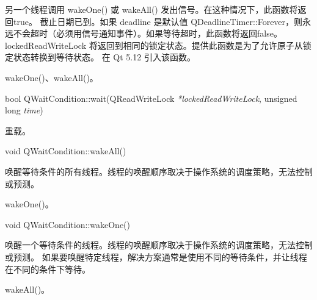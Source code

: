 另一个线程调用 wakeOne() 或 wakeAll() 发出信号。在这种情况下，此函数将返回true。
截止日期已到。如果 deadline 是默认值 QDeadlineTimer::Forever，则永远不会超时（必须用信号通知事件）。如果等待超时，此函数将返回false。
lockedReadWriteLock 将返回到相同的锁定状态。提供此函数是为了允许原子从锁定状态转换到等待状态。
在 Qt 5.12 引入该函数。


\begin{seeAlso}
wakeOne()、wakeAll()。
\end{seeAlso}


bool QWaitCondition::wait(QReadWriteLock \emph{*lockedReadWriteLock}, unsigned long \emph{time})

重载。

void QWaitCondition::wakeAll()

唤醒等待条件的所有线程。线程的唤醒顺序取决于操作系统的调度策略，无法控制或预测。

\begin{seeAlso}
wakeOne()。
\end{seeAlso}

void QWaitCondition::wakeOne()

唤醒一个等待条件的线程。线程的唤醒顺序取决于操作系统的调度策略，无法控制或预测。
如果要唤醒特定线程，解决方案通常是使用不同的等待条件，并让线程在不同的条件下等待。

\begin{seeAlso}
wakeAll()。
\end{seeAlso}
